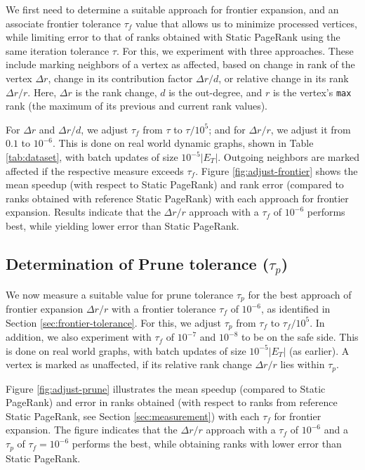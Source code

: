 We first need to determine a suitable approach for frontier expansion, and an associate frontier tolerance $\tau_f$ value that allows us to minimize processed vertices, while limiting error to that of ranks obtained with Static PageRank using the same iteration tolerance $\tau$. For this, we experiment with three approaches. These include marking neighbors of a vertex as affected, based on change in rank of the vertex $\Delta r$, change in its contribution factor $\Delta r/d$, or relative change in its rank $\Delta r/r$. Here, $\Delta r$ is the rank change, $d$ is the out-degree, and $r$ is the vertex's \texttt{max} rank (the maximum of its previous and current rank values).

For $\Delta r$ and $\Delta r/d$, we adjust $\tau_f$ from $\tau$ to $\tau/10^5$; and for $\Delta r/r$, we adjust it from $0.1$ to $10^{-6}$. This is done on real world dynamic graphs, shown in Table \ref{tab:dataset}, with batch updates of size $10^{-5}|E_T|$. Outgoing neighbors are marked affected if the respective measure exceeds $\tau_f$. Figure \ref{fig:adjust-frontier} shows the mean speedup (with respect to Static PageRank) and rank error (compared to ranks obtained with reference Static PageRank) with each approach for frontier expansion. Results indicate that the $\Delta r/r$ approach with a $\tau_f$ of $10^{-6}$ performs best, while yielding lower error than Static PageRank.








\subsection{Determination of Prune tolerance ($\tau_p$)}
\label{sec:prune-tolerance}

We now measure a suitable value for prune tolerance $\tau_p$ for the best approach of frontier expansion $\Delta r/r$ with a frontier tolerance $\tau_f$ of $10^{-6}$, as identified in Section \ref{sec:frontier-tolerance}. For this, we adjust $\tau_p$ from $\tau_f$ to $\tau_f/10^5$. In addition, we also experiment with $\tau_f$ of $10^{-7}$ and $10^{-8}$ to be on the safe side. This is done on real world graphs, with batch updates of size $10^{-5}|E_T|$ (as earlier). A vertex is marked as unaffected, if its relative rank change $\Delta r/r$ lies within $\tau_p$.

Figure \ref{fig:adjust-prune} illustrates the mean speedup (compared to Static PageRank) and error in ranks obtained (with respect to ranks from reference Static PageRank, see Section \ref{sec:measurement}) with each $\tau_f$ for frontier expansion. The figure indicates that the $\Delta r/r$ approach with a $\tau_f$ of $10^{-6}$ and a $\tau_p$ of $\tau_f = 10^{-6}$ performs the best, while obtaining ranks with lower error than Static PageRank.




